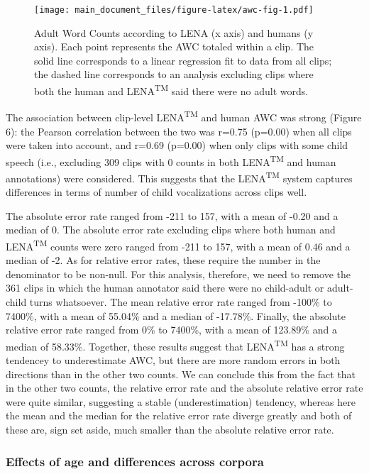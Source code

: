 \documentclass[english,floatsintext,man]{apa6}
\begin{document}
\begin{figure}
\centering
\texttt{[image: main\_document\_files/figure-latex/awc-fig-1.pdf]}
\caption{\label{fig:awc-fig}Adult Word Counts according to LENA (x axis) and
humans (y axis). Each point represents the AWC totaled within a clip.
The solid line corresponds to a linear regression fit to data from all
clips; the dashed line corresponds to an analysis excluding clips where
both the human and LENA\textsuperscript{TM} said there were no adult
words.}
\end{figure}

The association between clip-level LENA\textsuperscript{TM} and human
AWC was strong (Figure 6): the Pearson correlation between the two was
r=0.75 (p=0.00) when all clips were taken into account, and r=0.69
(p=0.00) when only clips with some child speech (i.e., excluding 309
clips with 0 counts in both LENA\textsuperscript{TM} and human
annotations) were considered. This suggests that the
LENA\textsuperscript{TM} system captures differences in terms of number
of child vocalizations across clips well.

The absolute error rate ranged from -211 to 157, with a mean of -0.20
and a median of 0. The absolute error rate excluding clips where both
human and LENA\textsuperscript{TM} counts were zero ranged from -211 to
157, with a mean of 0.46 and a median of -2. As for relative error
rates, these require the number in the denominator to be non-null. For
this analysis, therefore, we need to remove the 361 clips in which the
human annotator said there were no child-adult or adult-child turns
whatsoever. The mean relative error rate ranged from -100\% to 7400\%,
with a mean of 55.04\% and a median of -17.78\%. Finally, the absolute
relative error rate ranged from 0\% to 7400\%, with a mean of 123.89\%
and a median of 58.33\%. Together, these results suggest that
LENA\textsuperscript{TM} has a strong tendencey to underestimate AWC,
but there are more random errors in both directions than in the other
two counts. We can conclude this from the fact that in the other two
counts, the relative error rate and the absolute relative error rate
were quite similar, suggesting a stable (underestimation) tendency,
whereas here the mean and the median for the relative error rate diverge
greatly and both of these are, sign set aside, much smaller than the
absolute relative error rate.

\subsubsection{Effects of age and differences across
corpora}\label{effects-of-age-and-differences-across-corpora}
\end{document}
